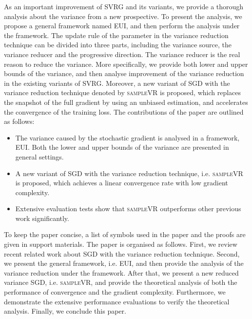 \documentclass[letterpaper]{article}
\begin{document}
As an important improvement of SVRG and its variants, we provide a thorough analysis about the variance from a new prospective. To present the analysis, we propose  a general framework named EUI, and then perform the analysis under the framework. The  update rule of the parameter in the variance reduction technique can be divided into three parts, including the variance source, the variance reducer and the progressive direction. The variance reducer is the real reason to reduce the variance.  More specifically, we provide both lower and upper bounds of the variance, and then analyse improvement of the variance reduction in the existing variants of SVRG.   Moreover, a new variant of SGD with the variance reduction technique denoted by \textsc{sampleVR} is proposed, which replaces the snapshot of the full gradient by using an unbiased estimation, and accelerates the convergence of the training loss.  The contributions of the paper are outlined as follows:
\begin{itemize}
\item  The variance caused by the stochastic gradient is analysed in a framework, EUI. Both the lower and upper bounds of the variance are presented in general settings.
\item A new variant of SGD with the variance reduction technique, i.e. \textsc{sampleVR} is proposed, which achieves a linear convergence rate with low gradient complexity.
\item Extensive evaluation tests show that \textsc{sampleVR} outperforms  other previous work significantly. 
\end{itemize}

To keep the paper concise, a list of symbols   used in the paper and the proofs are given in support materials. The paper is organised as follows. First, we review recent related work about SGD with the variance reduction technique. Second, we  present the general framework, i.e. EUI, and then provide the analysis of the variance reduction under the framework. After that, we present a new reduced variance SGD, i.e. \textsc{sampleVR}, and provide the theoretical analysis of both the performance of convergence and the gradient complexity.   Furthermore, we  demonstrate the extensive performance evaluations to verify the theoretical analysis. Finally, we conclude this paper. 


\end{document}
